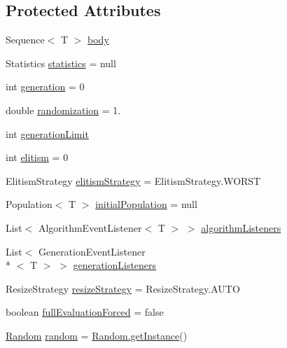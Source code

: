 \subsection*{Protected Attributes}
\begin{DoxyCompactItemize}
\item 
Sequence$<$ T $>$ \hyperlink{classjenes_1_1_genetic_algorithm_3_01_t_01extends_01_chromosome_01_4_a0040f9dbb0018e8bb28dde97dacac7d8}{body}
\item 
Statistics \hyperlink{classjenes_1_1_genetic_algorithm_3_01_t_01extends_01_chromosome_01_4_afc23d5cbab5434f5ec5684cda9434b93}{statistics} = null
\item 
int \hyperlink{classjenes_1_1_genetic_algorithm_3_01_t_01extends_01_chromosome_01_4_ac5a1ddc5e78e2b81c754eb990a91f17b}{generation} = 0
\item 
double \hyperlink{classjenes_1_1_genetic_algorithm_3_01_t_01extends_01_chromosome_01_4_adcb3e16398451c2e318de21d77b51d35}{randomization} = 1.
\item 
int \hyperlink{classjenes_1_1_genetic_algorithm_3_01_t_01extends_01_chromosome_01_4_a6677c80cf6ad470a0124fc2fa3051310}{generation\-Limit}
\item 
int \hyperlink{classjenes_1_1_genetic_algorithm_3_01_t_01extends_01_chromosome_01_4_ac4280b01e7da0ddc049050b19e28b8b9}{elitism} = 0
\item 
Elitism\-Strategy \hyperlink{classjenes_1_1_genetic_algorithm_3_01_t_01extends_01_chromosome_01_4_aacba3e1823ba66a2dd6d3c902f8ff719}{elitism\-Strategy} = Elitism\-Strategy.\-W\-O\-R\-S\-T
\item 
Population$<$ T $>$ \hyperlink{classjenes_1_1_genetic_algorithm_3_01_t_01extends_01_chromosome_01_4_ab6535da7a5097e18e6305d0f26f7cf5f}{initial\-Population} = null
\item 
List$<$ Algorithm\-Event\-Listener$<$ T $>$ $>$ \hyperlink{classjenes_1_1_genetic_algorithm_3_01_t_01extends_01_chromosome_01_4_a53540867ddd13889614232b3cbea6d6f}{algorithm\-Listeners}
\item 
List$<$ Generation\-Event\-Listener\\*
$<$ T $>$ $>$ \hyperlink{classjenes_1_1_genetic_algorithm_3_01_t_01extends_01_chromosome_01_4_a265c4e10d321e68ae5757abf68d88739}{generation\-Listeners}
\item 
Resize\-Strategy \hyperlink{classjenes_1_1_genetic_algorithm_3_01_t_01extends_01_chromosome_01_4_a56f08a1d1f3355921b83f08745dbb3b3}{resize\-Strategy} = Resize\-Strategy.\-A\-U\-T\-O
\item 
boolean \hyperlink{classjenes_1_1_genetic_algorithm_3_01_t_01extends_01_chromosome_01_4_adb627d0c6d6744f53ef5c3b7506913e9}{full\-Evaluation\-Forced} = false
\item 
\hyperlink{classjenes_1_1utils_1_1_random}{Random} \hyperlink{classjenes_1_1_genetic_algorithm_3_01_t_01extends_01_chromosome_01_4_a1579283e210144ba90b937be0911a028}{random} = \hyperlink{classjenes_1_1utils_1_1_random_aa8b8341f82ccf69de0b44c9f6f174820}{Random.\-get\-Instance}()
\end{DoxyCompactItemize}


